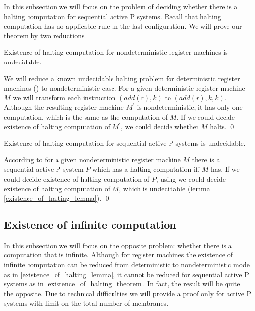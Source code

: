 In this subsection we will focus on the problem of deciding whether there is a halting computation for sequential active P systems. Recall that halting computation has no applicable rule in the last configuration. We will prove our theorem by two reductions.

\begin{lemma}
\label{existence_of_halting_lemma}
  Existence of halting computation for nondeterministic register machines is undecidable.
\end{lemma}
\begin{dokaz}
  We will reduce a known undecidable halting problem for deterministic register machines (\cite{Minsky67RegisterMachines}) to nondeterministic case. For a given deterministic register machine $M$ we will transform each instruction $(add(r),k)$ to $(add(r),k,k)$. Although the resulting register machine $M^\prime$ is nondeterministic, it has only one computation, which is the same as the computation of $M$. If we could decide existence of halting computation of $M^\prime$, we could decide whether $M$ halts. \qed
\end{dokaz}
\begin{veta}
\label{existence_of_halting_theorem}
  Existence of halting computation for sequential active P systems is undecidable.
\end{veta}

\begin{dokaz}
  According to \cite{Ibarra05Active} for a given nondeterministic register machine $M$ there is a sequential active P system $P$ which has a halting computation iff $M$ has. If we could decide existence of halting computation of $P$, using \cite{Ibarra05Active} we could decide existence of halting computation of $M$, which is undecidable (lemma \ref{existence_of_halting_lemma}). \qed
\end{dokaz}


\subsection{Existence of infinite computation} %
\label{sub:existence_of_infinite_computation}

In this subsection we will focus on the opposite problem: whether there is a computation that is infinite. Although for register machines the existence of infinite computation can be reduced from deterministic to nondeterministic mode as in \ref{existence_of_halting_lemma}, it cannot be reduced for sequential active P systems as in \ref{existence_of_halting_theorem}. In fact, the result will be quite the opposite. Due to technical difficulties we will provide a proof only for active P systems with limit on the total number of membranes.

